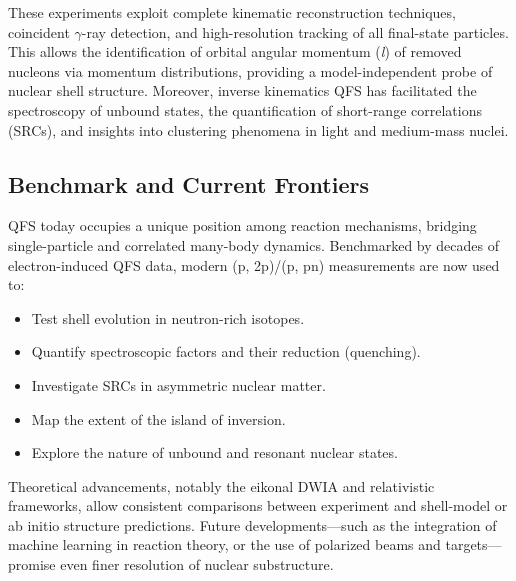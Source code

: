 These experiments exploit complete kinematic reconstruction techniques, coincident $\gamma$-ray detection, and high-resolution tracking of all final-state particles. This allows the identification of orbital angular momentum (\emph{l}) of removed nucleons via momentum distributions, providing a model-independent probe of nuclear shell structure. Moreover, inverse kinematics \gls{QFS} has facilitated the spectroscopy of unbound states, the quantification of short-range correlations (SRCs), and insights into clustering phenomena in light and medium-mass nuclei.


\subsection{Benchmark and Current Frontiers}

\gls{QFS} today occupies a unique position among reaction mechanisms, bridging single-particle and correlated many-body dynamics. Benchmarked by decades of electron-induced \gls{QFS} data, modern (p, 2p)/(p, pn) measurements are now used to:

\begin{itemize}
	\item Test shell evolution in neutron-rich isotopes.
	\item Quantify spectroscopic factors and their reduction (quenching).
	\item Investigate SRCs in asymmetric nuclear matter.
	\item Map the extent of the island of inversion.
	\item Explore the nature of unbound and resonant nuclear states.
\end{itemize}

Theoretical advancements, notably the eikonal DWIA and relativistic frameworks, allow consistent comparisons between experiment and shell-model or ab initio structure predictions. Future developments—such as the integration of machine learning in reaction theory, or the use of polarized beams and targets—promise even finer resolution of nuclear substructure.


%



